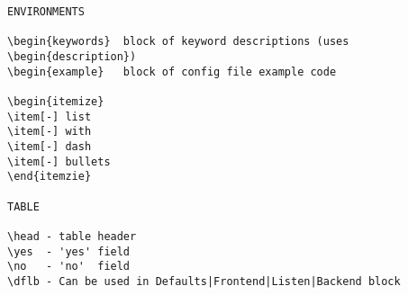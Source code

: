 \begin{verbatim}
ENVIRONMENTS

\begin{keywords}  block of keyword descriptions (uses \begin{description})
\begin{example}   block of config file example code

\begin{itemize}
\item[-] list
\item[-] with
\item[-] dash
\item[-] bullets
\end{itemzie}

TABLE

\head - table header
\yes  - 'yes' field
\no   - 'no'  field
\dflb - Can be used in Defaults|Frontend|Listen|Backend block

\end{verbatim}